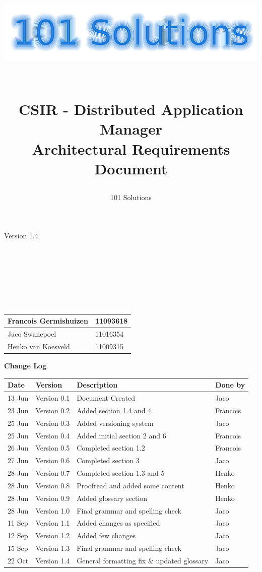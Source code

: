 \documentclass[a4paper,12pt,final]{article}
\title{
\begin{center}
  	\includegraphics[scale=0.3]{101Logo.png} 
  \end{center}
  \textbf{\\}
CSIR - Distributed Application Manager\\
Architectural Requirements Document\\
}
\author{101 Solutions}
\begin{document}
\maketitle
\begin{center}
Version 1.4
\end{center}
\textbf{\\}
\textbf{\\}
\textbf{\\}
\textbf{\\}
\textbf{\\}
\textbf{\\}
\begin{center}
\begin{tabular}{|l|l|}
\hline
Francois Germishuizen & 11093618\\
\hline
Jaco Swanepoel & 11016354\\
\hline
Henko van Koesveld & 11009315\\
\hline
\end{tabular}
\end{center}
\thispagestyle{empty}
\newpage
\thispagestyle{empty}
\textbf{\large{Change Log}}
\vspace{6pt}\newline
\begin{tabular}{|l|l|l|l|}
\hline
\textbf{Date} & \textbf{Version} & \textbf{Description} & \textbf{Done by}\\
\hline
13 Jun & Version 0.1 & Document Created & Jaco\\
\hline
23 Jun & Version 0.2 & Added section 1.4 and 4 & Francois\\
\hline
25 Jun & Version 0.3 & Added versioning system & Jaco\\
\hline
25 Jun & Version 0.4 & Added initial section 2 and 6 & Francois\\
\hline
26 Jun & Version 0.5 & Completed section 1.2 & Francois\\
\hline
27 Jun & Version 0.6 & Completed section 3 & Jaco\\
\hline
28 Jun & Version 0.7 & Completed section 1.3 and 5 & Henko\\
\hline
28 Jun & Version 0.8 & Proofread and added some content & Henko\\
\hline
28 Jun & Version 0.9 & Added glossary section & Henko\\
\hline
28 Jun & Version 1.0 & Final grammar and spelling check & Jaco\\
\hline
11 Sep & Version 1.1 & Added changes as specified & Jaco\\
\hline
12 Sep & Version 1.2 & Added few changes & Jaco\\
\hline
15 Sep & Version 1.3 & Final grammar and spelling check & Jaco\\
\hline
22 Oct & Version 1.4 & General formatting fix \& updated glossary & Jaco\\
\hline
\end{tabular}
\newpage
\tableofcontents
\thispagestyle{empty}
\newpage
\end{document}
